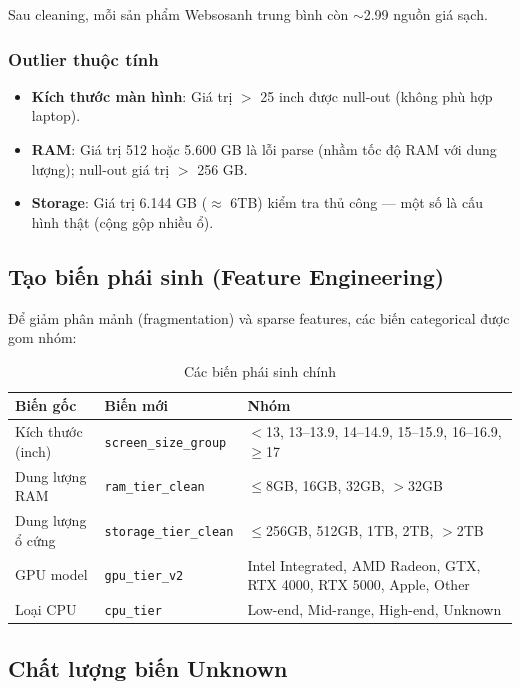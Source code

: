 Sau cleaning, mỗi sản phẩm Websosanh trung bình còn $\sim$2.99 nguồn giá sạch.

\subsubsection{Outlier thuộc tính}
\begin{itemize}[noitemsep]
    \item \textbf{Kích thước màn hình}: Giá trị $>$ 25 inch được null-out (không phù hợp laptop).
    \item \textbf{RAM}: Giá trị 512 hoặc 5.600 GB là lỗi parse (nhầm tốc độ RAM với dung lượng); null-out giá trị $>$ 256 GB.
    \item \textbf{Storage}: Giá trị 6.144 GB ($\approx$ 6TB) kiểm tra thủ công --- một số là cấu hình thật (cộng gộp nhiều ổ).
\end{itemize}

\subsection{Tạo biến phái sinh (Feature Engineering)}

Để giảm phân mảnh (fragmentation) và sparse features, các biến categorical được gom nhóm:

\begin{table}[H]
    \centering
    \caption{Các biến phái sinh chính}
    \label{tab:derived-features}
    \begin{tabular}{lll}
        \toprule
        \textbf{Biến gốc} & \textbf{Biến mới} & \textbf{Nhóm} \\
        \midrule
        Kích thước (inch)  & \texttt{screen\_size\_group} & $<$13, 13--13.9, 14--14.9, 15--15.9, 16--16.9, $\geq$17 \\
        Dung lượng RAM     & \texttt{ram\_tier\_clean}    & $\leq$8GB, 16GB, 32GB, $>$32GB \\
        Dung lượng ổ cứng  & \texttt{storage\_tier\_clean} & $\leq$256GB, 512GB, 1TB, 2TB, $>$2TB \\
        GPU model          & \texttt{gpu\_tier\_v2}       & Intel Integrated, AMD Radeon, GTX, RTX 4000, RTX 5000, Apple, Other \\
        Loại CPU           & \texttt{cpu\_tier}           & Low-end, Mid-range, High-end, Unknown \\
        \bottomrule
    \end{tabular}
\end{table}

\subsection{Chất lượng biến Unknown}

